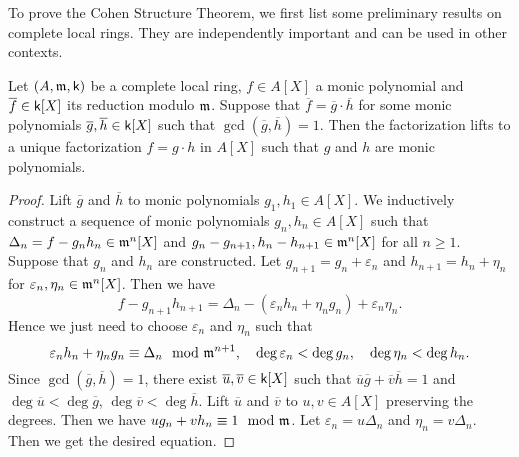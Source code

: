 
        To prove the Cohen Structure Theorem, we first list some preliminary results on complete local rings.
        They are independently important and can be used in other contexts.

        \begin{theorem}\label{thm: Hensel Lemma}
            Let \((A,{\mathfrak{m}}, {\mathsf{k}})\) be a complete local ring, \(f \in A[X]\) a monic polynomial and \(\overline{f} \in {\mathsf{k}}[X]\) its reduction modulo \({\mathfrak{m}}\).
            Suppose that \(\overline{f} = \overline{g} \cdot \overline{h}\) for some monic polynomials \(\overline{g}, \overline{h} \in {\mathsf{k}}[X]\) such that \(\gcd (\overline{g},\overline{h}) = 1\).
            Then the factorization lifts to a unique factorization \(f = g \cdot h\) in \(A[X]\) such that \(g\) and \(h\) are monic polynomials.
        \end{theorem}
        \begin{proof}
            Lift \(\overline{g}\) and \(\overline{h}\) to monic polynomials \(g_1, h_1 \in A[X]\).
            We inductively construct a sequence of monic polynomials \(g_n, h_n \in A[X]\) such that \(\Delta_n=f - g_nh_n \in {\mathfrak{m}}^n[X]\) and \(g_n-g_{n+1}, h_n-h_{n+1} \in {\mathfrak{m}}^{n}[X]\) for all \(n\geq 1\).
            Suppose that \(g_n\) and \(h_n\) are constructed.
            Let \(g_{n+1} = g_n + \varepsilon_n\) and \(h_{n+1} = h_n + \eta_n\) for \(\varepsilon_n, \eta_n \in {\mathfrak{m}}^{n}[X]\).
            Then we have
            \[ f-g_{n+1}h_{n+1} = \Delta_n - (\varepsilon_n h_n + \eta_n g_n) + \varepsilon_n \eta_n. \]
            Hence we just need to choose \(\varepsilon_n\) and \(\eta_n\) such that
            \[ \varepsilon_n h_n + \eta_n g_n \equiv \Delta_n \mod {{\mathfrak{m}}}^{n+1}, \quad \deg \varepsilon_n < \deg g_n, \quad \deg \eta_n < \deg h_n. \]
            Since \(\gcd (\overline{g},\overline{h}) = 1\), there exist \(\overline{u},\overline{v} \in {\mathsf{k}}[X]\) such that \(\overline{u} \overline{g} + \overline{v} \overline{h} = 1\) and \(\deg \overline{u} < \deg \overline{g}\), \(\deg \overline{v} < \deg \overline{h}\).
            Lift \(\overline{u}\) and \(\overline{v}\) to \(u, v \in A[X]\) preserving the degrees.
            Then we have \(ug_n + vh_n \equiv 1 \mod {{\mathfrak{m}}}\).
            Let \(\varepsilon_n = u \Delta_n\) and \(\eta_n = v \Delta_n\).
            Then we get the desired equation.
        \end{proof}

